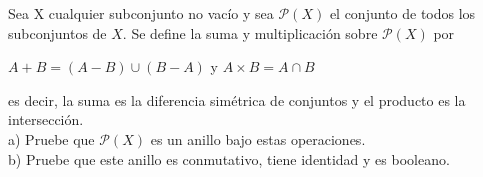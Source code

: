 \begin{problem}[21] Sea X cualquier subconjunto no vacío y sea $\mathcal{P} (X)$ el conjunto de todos los subconjuntos de $X$. Se define la suma y multiplicación sobre $\mathcal{P} (X)$ por \\
\begin{center}
    $A+B = (A - B) \cup (B - A) $ \hspace{3mm} y \hspace{3mm} $A\times B = A \cap B$
\end{center}
\vspace{3mm}

es decir, la suma es la diferencia simétrica de conjuntos y el producto es la intersección.\\

a) Pruebe que $\mathcal{P}(X)$ es un anillo bajo estas operaciones.\\
b) Pruebe que este anillo es conmutativo, tiene identidad y es booleano.\\


\end{problem}

